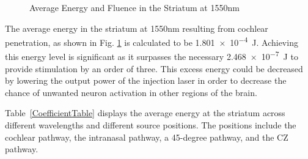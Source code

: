 \documentclass[journal,twoside,web]{ieeecolor}
\begin{document}
\begin{figure}[hbt]
    \caption{\label{fig:Avg1550} Average Energy and Fluence in the Striatum at 1550nm}
\end{figure}


The average energy in the striatum at 1550nm resulting from cochlear penetration, as shown in Fig. \ref{fig:Avg1550} is calculated to 
be \SI{1.801e-4}{\joule}. Achieving this energy level is significant as it surpasses the necessary \SI{2.468e-7}{\joule} to provide stimulation by an order of three. 
This excess energy could be decreased by lowering the output power of the injection laser in order to decrease the chance of unwanted neuron 
activation in other regions of the brain.

Table~\ref{CoefficientTable} displays the average energy at the striatum across different wavelengths and different source positions. The positions include the cochlear pathway, the intranasal pathway, a 45-degree pathway, and the CZ pathway.

\begin{table}[hbt!]
    \centering
    \caption{Estimated Optical Coefficients}
    \label{CoefficientTable}
    \setlength{\tabcolsep}{3pt}
    \renewcommand{\arraystretch}{1.5}
\end{table}
\end{document}
